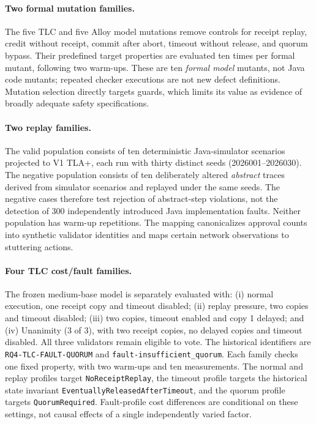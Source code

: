 \paragraph{Two formal mutation families.}
The five TLC and five Alloy model mutations remove controls for receipt
replay, credit without receipt, commit after abort, timeout without release,
and quorum bypass. Their predefined target properties are evaluated ten times
per formal mutant, following two warm-ups. These are ten \emph{formal model}
mutants, not Java code mutants; repeated checker executions are not new
defect definitions. Mutation selection directly targets guards, which limits
its value as evidence of broadly adequate safety specifications.

\paragraph{Two replay families.}
The valid population consists of ten deterministic Java-simulator scenarios
projected to V1 TLA+, each run with thirty distinct seeds (2026001--2026030).
The negative population consists of ten deliberately altered \emph{abstract}
traces derived from simulator scenarios and replayed under the same seeds.
The negative cases therefore test rejection of abstract-step violations, not
the detection of 300 independently introduced Java implementation faults.
Neither population has warm-up repetitions. The mapping canonicalizes
approval counts into synthetic validator identities and maps certain network
observations to stuttering actions.

\paragraph{Four TLC cost/fault families.}
The frozen medium-base model is separately evaluated with: (i) normal
execution, one receipt copy and timeout disabled; (ii) replay pressure, two
copies and timeout disabled; (iii) two copies, timeout enabled and copy 1 delayed; and
(iv) Unanimity (3 of 3), with two receipt copies, no delayed copies and
timeout disabled. All three validators remain eligible to vote. The historical
identifiers are \texttt{RQ4-TLC-FAULT-QUORUM} and
\texttt{fault-insufficient\_quorum}. Each family
checks one fixed property, with two warm-ups and ten measurements. The
normal and replay profiles target \texttt{NoReceiptReplay}, the timeout
profile targets the historical state invariant
\texttt{EventuallyReleasedAfterTimeout}, and the quorum profile targets
\texttt{QuorumRequired}. Fault-profile cost differences are conditional on
these settings, not causal effects of a single independently varied factor.

